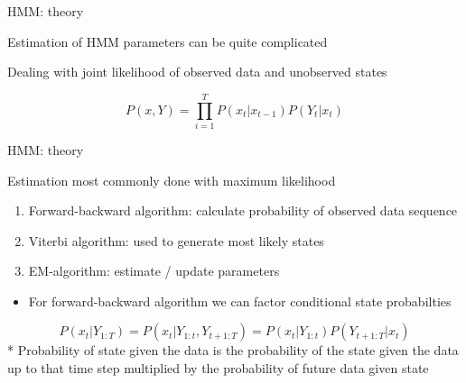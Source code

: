 \documentclass[
  ignorenonframetext,
]{beamer}
\providecommand{\tightlist}{%
  \setlength{\itemsep}{0pt}\setlength{\parskip}{0pt}}
\begin{document}
\begin{frame}{HMM: theory}
\protect\hypertarget{hmm-theory-9}{}

Estimation of HMM parameters can be quite complicated

Dealing with joint likelihood of observed data and unobserved states

\[P(x,Y)=\prod _{ i=1 }^{ T }{ P({ x }_{ t }|{ x }_{ t-1 })P({ Y }_{ t }|{ x }_{ t }) }\]

\end{frame}

\begin{frame}{HMM: theory}
\protect\hypertarget{hmm-theory-10}{}

Estimation most commonly done with maximum likelihood

\begin{enumerate}
\tightlist
\item
  Forward-backward algorithm: calculate probability of observed data
  sequence
\item
  Viterbi algorithm: used to generate most likely states
\item
  EM-algorithm: estimate / update parameters
\end{enumerate}

\begin{itemize}
\tightlist
\item
  For forward-backward algorithm we can factor conditional state
  probabilties
\end{itemize}

\[P\left( { x }_{ t }|{ Y }_{ 1:T } \right) =P({ x }_{ t }|{ Y }_{ 1:t },{ Y }_{ t+1:T })=P({ x }_{ t }|{ Y }_{ 1:t })P({ Y }_{ t+1:T }|{ x }_{ t })\]
* Probability of state given the data is the probability of the state
given the data up to that time step multiplied by the probability of
future data given state

\end{frame}
\end{document}
